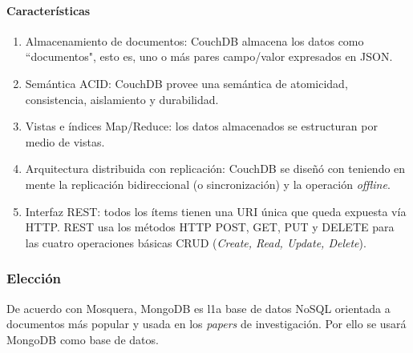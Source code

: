 \paragraph*{Características}
\begin{enumerate}
    \item Almacenamiento de documentos: CouchDB almacena los datos como ``documentos", esto es, uno o más pares campo/valor expresados en JSON. 
    \item Semántica ACID: CouchDB provee una semántica de atomicidad, consistencia, aislamiento y durabilidad.
    \item Vistas e índices Map/Reduce: los datos almacenados se estructuran por medio de vistas. 
    \item Arquitectura distribuida con replicación: CouchDB se diseñó con teniendo en mente la replicación bidireccional (o sincronización) y la operación \textit{offline}. 
    \item Interfaz REST: todos los ítems tienen una URI única que queda expuesta vía HTTP. REST usa los métodos HTTP POST, GET, PUT y DELETE para las cuatro operaciones básicas CRUD (\textit{Create, Read, Update, Delete}).
\end{enumerate}

\subsubsection*{Elección}

De acuerdo con Mosquera\cite{martinez-mosquera_modeling_2020}, MongoDB es l1a base de datos NoSQL orientada a documentos más popular y usada en los \textit{papers} de investigación. Por ello se usará MongoDB como base de datos.

